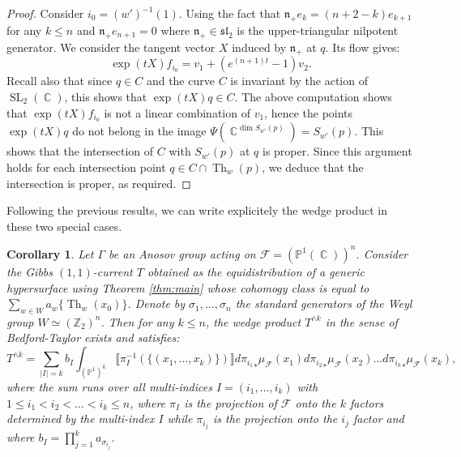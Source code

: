 \documentclass[12pt]{amsbook}%
\newtheorem{cor}[thm]{Corollary}
\theoremstyle{definition}
\theoremstyle{remark}
\numberwithin{section}{chapter}
\numberwithin{subsection}{section}
\numberwithin{figure}{chapter}
\DeclareMathOperator{\C}{\mathbb{C}}
\DeclareMathOperator{\SL}{SL}
\DeclareMathOperator{\Id}{Id}
\DeclareMathOperator{\Th}{Th}
\newcommand\intcur[1]{\llbracket #1 \rrbracket}
\def\bP{{\mathbb{P}}}
\def\cF{{\mathscr{F}}}
\def\Ga{\Gamma}
\begin{document}
{{\begin{proof}
Consider $i_0 = (w')^{-1}(1)$.
Using the fact that $\mathfrak{n}_+ e_{k} = (n+2 - k) e_{k+1}$ for any $k\leqslant n$ and $\mathfrak{n}_+ e_{n+1}=0$ where $\mathfrak{n}_+ \in \mathfrak{sl}_2$ is the upper-triangular nilpotent generator. 
We consider the tangent vector $X $ induced by $\mathfrak{n}_+$ at $q$. Its flow gives:
\begin{equation*}
\exp(tX) f_{i_0} =  v_1 +  (e^{(n+1)t}-1) v_{2} . 
\end{equation*} 
Recall also that since $q \in C$ and the curve $C$ is invariant by the action of $\SL_2(\C)$, this shows that $\exp(tX) q \in C$. 
The above computation shows that $\exp(tX) f_{i_0}$ is not a linear combination of $v_1$, hence the points $\exp(tX) q $ do not belong in the image $\Psi(\C^{\dim S_{w'}(p)}) = S_{w'}(p)$. 
This shows that the intersection of $C$ with $S_{w'}(p)$ at $q$ is proper. 
Since this argument holds for each intersection point $q \in C\cap \Th_{w}(p)$, we deduce that the intersection is proper, as required.  
\end{proof}


Following the previous results, we can write explicitely the wedge product in these two special cases. 


\begin{cor} 
 Let $\Ga$ be an Anosov group acting on $\cF = (\bP^1(\C))^n$.  Consider the Gibbs $(1,1)$-current $T$ obtained as the equidistribution of a generic hypersurface using Theorem \ref{thm:main} whose cohomogy class is equal to $\sum_{w \in W} a_w \{ \Th_w(x_0) \}$. Denote by $\sigma_1, \ldots , \sigma_n$ the standard generators of the Weyl group $W \simeq (\mathbb{Z}_2)^n$.  Then for any $k\leqslant n$, the wedge product $T^{\wedge k}$ in the sense of Bedford-Taylor exists and satisfies: 
\begin{equation*}
T^{\wedge k} = \sum_{ |I| =  k } b_I \int_{(\bP^1)^k} \intcur{\pi_I^{-1}(\{(x_1,\ldots, x_k)\})} d {\pi_{i_1}}_*\mu_{\cF}(x_1) d{\pi_{i_2}}_*\mu_{\cF}(x_2) \ldots d {\pi_{i_k}}_*\mu_{\cF}(x_k),
\end{equation*}
where the sum runs over all multi-indices $I = (i_1, \ldots, i_k)$ with $1 \leqslant i_1 < i_2 < \ldots < i_k \leqslant n$, where $\pi_I$ is the projection of $\cF$ onto the $k$ factors determined by the multi-index $I$ while $\pi_{i_j}$ is the projection onto the $i_j$ factor and where $b_I = \prod_{j=1}^k a_{\sigma_{i_j}}$.  
\end{cor}

}}
\end{document}
